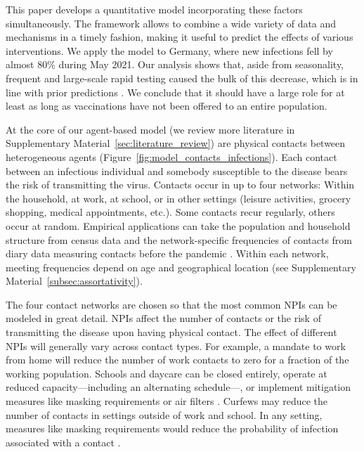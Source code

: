 \documentclass[12pt]{article}
\begin{document}
This paper develops a quantitative model incorporating these factors simultaneously. The
framework allows to combine a wide variety of data and mechanisms in a timely fashion,
making it useful to predict the effects of various interventions. We apply the model to
Germany, where new infections fell by almost 80\% during May 2021. Our analysis
shows that, aside from seasonality, frequent and large-scale rapid testing caused the
bulk of this decrease, which is in line with prior predictions \cite{Mina2021}. We
conclude that it should have a large role for at least as long as vaccinations have not
been offered to an entire population.

At the core of our agent-based model \cite{Aleta2020,Hinch2020} (we review more
literature in Supplementary Material~\ref{sec:literature_review}) are physical contacts
between heterogeneous agents (Figure~\ref{fig:model_contacts_infections}). Each contact
between an infectious individual and somebody susceptible to the disease bears the risk
of transmitting the virus. Contacts occur in up to four networks: Within the household,
at work, at school, or in other settings (leisure activities, grocery shopping, medical
appointments, etc.). Some contacts recur regularly, others occur at random. Empirical
applications can take the population and household structure from census data and the
network-specific frequencies of contacts from diary data measuring contacts before the
pandemic \cite{Mossong2008,Hoang2019}. Within each network, meeting frequencies depend
on age and geographical location (see Supplementary
Material~\ref{subsec:assortativity}).

The four contact networks are chosen so that the most common NPIs can be modeled in
great detail. NPIs affect the number of contacts or the risk of transmitting the disease
upon having physical contact. The effect of different NPIs will generally vary across
contact types. For example, a mandate to work from
home will reduce the number of work contacts to zero for a fraction of the working
population. Schools and daycare can be closed entirely, operate at reduced
capacity---including an alternating schedule---, or implement mitigation measures like
masking requirements or air filters \cite{Lessler2021}. Curfews may reduce the number
of contacts in settings outside of
work and school. In any setting, measures like masking requirements would reduce the
probability of infection associated with a contact
\cite{Cheng2021}.
\end{document}

